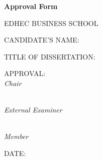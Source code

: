 \thispagestyle{empty}

\begin{center}
{\large\bfseries Approval Form}

\vspace{0.5in}

{\large EDHEC BUSINESS SCHOOL}
\end{center}

\vspace{1in}

\noindent CANDIDATE'S NAME: \hrulefill

\vspace{0.5in}

\noindent TITLE OF DISSERTATION: \hrulefill

\noindent \hrulefill

\vspace{0.8in}

\noindent APPROVAL: \hrulefill \\
\hspace*{1.5in} \textit{Chair}

\vspace{0.5in}

\noindent \hspace*{1.5in} \hrulefill \\
\hspace*{1.5in} \textit{External Examiner}

\vspace{0.5in}

\noindent \hspace*{1.5in} \hrulefill \\
\hspace*{1.5in} \textit{Member}

\vspace{0.5in}

\noindent DATE: \hrulefill
